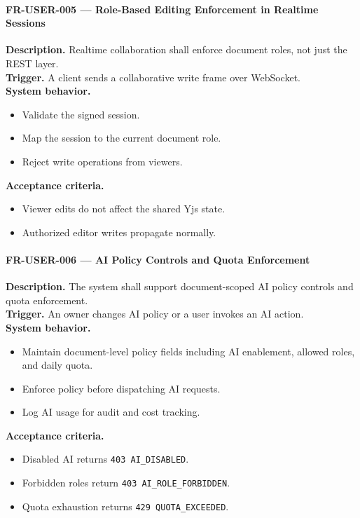 \paragraph{FR-USER-005 --- Role-Based Editing Enforcement in Realtime Sessions}
\textbf{Description.} Realtime collaboration shall enforce document roles, not just the REST layer.\\
\textbf{Trigger.} A client sends a collaborative write frame over WebSocket.\\
\textbf{System behavior.}
\begin{itemize}
  \item Validate the signed session.
  \item Map the session to the current document role.
  \item Reject write operations from viewers.
\end{itemize}
\textbf{Acceptance criteria.}
\begin{itemize}
  \item Viewer edits do not affect the shared Yjs state.
  \item Authorized editor writes propagate normally.
\end{itemize}

\paragraph{FR-USER-006 --- AI Policy Controls and Quota Enforcement}
\textbf{Description.} The system shall support document-scoped AI policy controls and quota enforcement.\\
\textbf{Trigger.} An owner changes AI policy or a user invokes an AI action.\\
\textbf{System behavior.}
\begin{itemize}
  \item Maintain document-level policy fields including AI enablement, allowed roles, and daily quota.
  \item Enforce policy before dispatching AI requests.
  \item Log AI usage for audit and cost tracking.
\end{itemize}
\textbf{Acceptance criteria.}
\begin{itemize}
  \item Disabled AI returns \texttt{403 AI\_DISABLED}.
  \item Forbidden roles return \texttt{403 AI\_ROLE\_FORBIDDEN}.
  \item Quota exhaustion returns \texttt{429 QUOTA\_EXCEEDED}.
\end{itemize}

